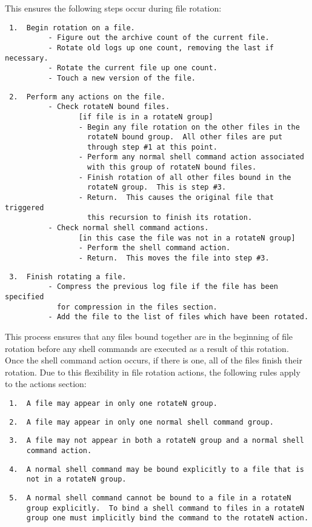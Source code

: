 \documentclass{article}
\begin{document}
This ensures the following steps occur during file rotation:
\begin{verbatim}
 1.  Begin rotation on a file.
          - Figure out the archive count of the current file.
          - Rotate old logs up one count, removing the last if necessary.
          - Rotate the current file up one count.
          - Touch a new version of the file.
\end{verbatim}
\begin{verbatim}
 2.  Perform any actions on the file.
          - Check rotateN bound files.
                 [if file is in a rotateN group]
                 - Begin any file rotation on the other files in the
                   rotateN bound group.  All other files are put
                   through step #1 at this point.
                 - Perform any normal shell command action associated
                   with this group of rotateN bound files.
                 - Finish rotation of all other files bound in the
                   rotateN group.  This is step #3.
                 - Return.  This causes the original file that triggered
                   this recursion to finish its rotation.
          - Check normal shell command actions.
                 [in this case the file was not in a rotateN group]
                 - Perform the shell command action.
                 - Return.  This moves the file into step #3.
\end{verbatim}
\begin{verbatim}
 3.  Finish rotating a file.
          - Compress the previous log file if the file has been specified
            for compression in the files section.
          - Add the file to the list of files which have been rotated.
\end{verbatim}

This process ensures that any files bound together are in the beginning
of file rotation before any shell commands are executed as a result of
this rotation.  Once the shell command action occurs, if there is one,
all of the files finish their rotation.  Due to this flexibility in file
rotation actions, the following rules apply to the actions section:
\begin{verbatim}
 1.  A file may appear in only one rotateN group.
\end{verbatim}
\begin{verbatim}
 2.  A file may appear in only one normal shell command group.
\end{verbatim}
\begin{verbatim}
 3.  A file may not appear in both a rotateN group and a normal shell
     command action.
\end{verbatim}
\begin{verbatim}
 4.  A normal shell command may be bound explicitly to a file that is
     not in a rotateN group.
\end{verbatim}
\begin{verbatim}
 5.  A normal shell command cannot be bound to a file in a rotateN
     group explicitly.  To bind a shell command to files in a rotateN
     group one must implicitly bind the command to the rotateN action.
\end{verbatim}
\end{document}
